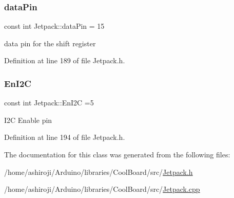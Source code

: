 \subsubsection{\texorpdfstring{data\+Pin}{dataPin}}
{\footnotesize\ttfamily const int Jetpack\+::data\+Pin = 15\hspace{0.3cm}{\ttfamily [private]}}

data pin for the shift register 

Definition at line 189 of file Jetpack.\+h.

\mbox{\label{class_jetpack_a81df984fb4cea98c71aa1a1cfcdfe814}} 
\subsubsection{\texorpdfstring{En\+I2C}{EnI2C}}
{\footnotesize\ttfamily const int Jetpack\+::\+En\+I2C =5\hspace{0.3cm}{\ttfamily [private]}}

I2C Enable pin 

Definition at line 194 of file Jetpack.\+h.



The documentation for this class was generated from the following files\+:\begin{DoxyCompactItemize}
\item 
/home/ashiroji/\+Arduino/libraries/\+Cool\+Board/src/\hyperlink{_jetpack_8h}{Jetpack.\+h}\item 
/home/ashiroji/\+Arduino/libraries/\+Cool\+Board/src/\hyperlink{_jetpack_8cpp}{Jetpack.\+cpp}\end{DoxyCompactItemize}

